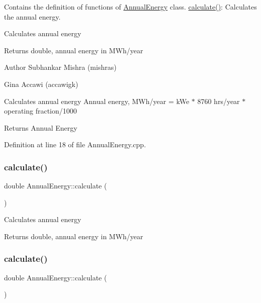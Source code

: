 Contains the definition of functions of \hyperlink{class_annual_energy}{Annual\+Energy} class. \hyperlink{class_annual_energy_ab599860ffb32ce20a1042a3e9d2ad57f}{calculate()}\+: Calculates the annual energy. 

Calculates annual energy \begin{DoxyReturn}{Returns}
double, annual energy in M\+Wh/year
\end{DoxyReturn}
\begin{DoxyAuthor}{Author}
Subhankar Mishra (mishras) 

Gina Accawi (accawigk) 
\end{DoxyAuthor}
Calculates annual energy Annual energy, M\+Wh/year = k\+We $\ast$ 8760 hrs/year $\ast$ operating fraction/1000 \begin{DoxyReturn}{Returns}
Annual Energy 
\end{DoxyReturn}


Definition at line 18 of file Annual\+Energy.\+cpp.

\mbox{\label{class_annual_energy_ab599860ffb32ce20a1042a3e9d2ad57f}} 
\subsubsection{\texorpdfstring{calculate()}{calculate()}\hspace{0.1cm}{\footnotesize\ttfamily [2/3]}}
{\footnotesize\ttfamily double Annual\+Energy\+::calculate (\begin{DoxyParamCaption}{ }\end{DoxyParamCaption})}

Calculates annual energy \begin{DoxyReturn}{Returns}
double, annual energy in M\+Wh/year 
\end{DoxyReturn}
\mbox{\label{class_annual_energy_ab599860ffb32ce20a1042a3e9d2ad57f}} 
\subsubsection{\texorpdfstring{calculate()}{calculate()}\hspace{0.1cm}{\footnotesize\ttfamily [3/3]}}
{\footnotesize\ttfamily double Annual\+Energy\+::calculate (\begin{DoxyParamCaption}{ }\end{DoxyParamCaption})}

